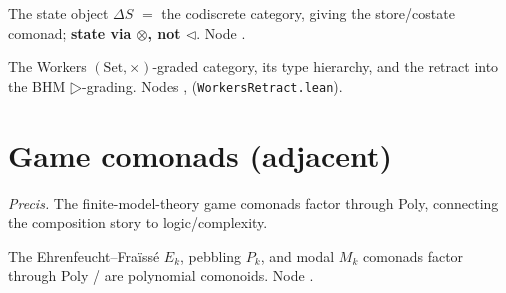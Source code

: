 \documentclass[11pt]{article}
\begin{document}
\begin{theorem}
The state object $ΔS$ $=$ the codiscrete category, giving the store/costate comonad;
\textbf{state via $\otimes$, not $\triangleleft$}. Node .
\end{theorem}

\begin{theorem}
The Workers $(\mathrm{Set},\times)$-graded category, its type hierarchy, and the retract into the
BHM $▷$-grading. Nodes , 
(\texttt{WorkersRetract.lean}).
\end{theorem}

\section{Game comonads (adjacent)}
\emph{Precis.} The finite-model-theory game comonads factor through Poly, connecting the
composition story to logic/complexity.

\begin{theorem}
The Ehrenfeucht--Fra\"iss\'e $E_k$, pebbling $P_k$, and modal $M_k$ comonads factor through Poly /
are polynomial comonoids. Node .
\end{theorem}
\end{document}
